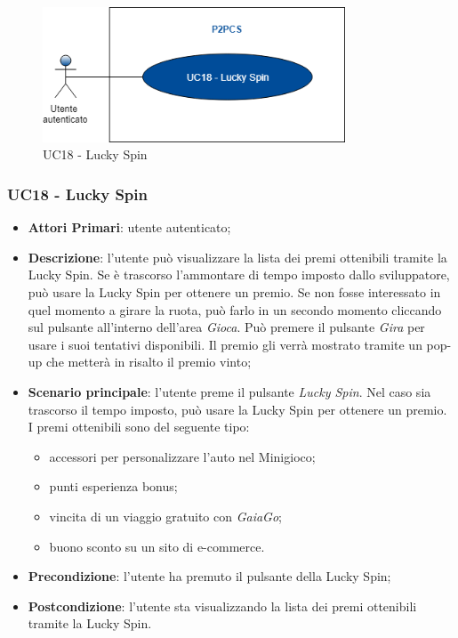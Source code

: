 \begin{figure}[h]
	\includegraphics[width=9cm]{res/images/UC20Luckyspin.png}
	\centering
	\caption{UC18 - Lucky Spin}
\end{figure}
\subsubsection{UC18 - Lucky Spin}
\begin{itemize}
	\item \textbf{Attori Primari}: utente autenticato;
	\item \textbf{Descrizione}:	l'utente può visualizzare la lista dei premi ottenibili tramite la Lucky Spin\glo. Se è trascorso l'ammontare di tempo imposto dallo sviluppatore, può usare la Lucky Spin per ottenere un premio. Se non fosse interessato in quel momento a girare la ruota, può farlo in un secondo momento cliccando sul pulsante all'interno dell'area \textit{Gioca}.
	Può premere il pulsante \textit{Gira} per usare i suoi tentativi disponibili. Il premio gli verrà mostrato tramite un pop-up che metterà in risalto il premio vinto;
	\item \textbf{Scenario principale}: l'utente preme il pulsante \textit{Lucky Spin}. Nel caso sia trascorso il tempo imposto, può usare la Lucky Spin per ottenere un premio. I premi ottenibili sono del seguente tipo:
	\begin{itemize}
		\item accessori per personalizzare l'auto nel Minigioco;
		\item punti esperienza bonus;
		\item vincita di un viaggio gratuito con \textit{GaiaGo};
		\item buono sconto su un sito di e-commerce.	
	\end{itemize}
	\item \textbf{Precondizione}: l'utente ha premuto il pulsante della Lucky Spin;
	\item \textbf{Postcondizione}: l'utente sta visualizzando la lista dei premi ottenibili tramite la Lucky Spin.
\end{itemize}


